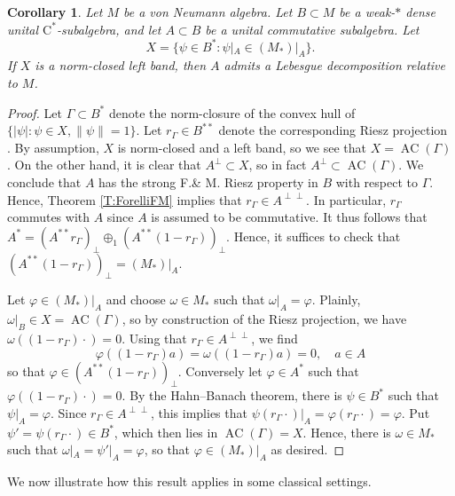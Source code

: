 \documentclass[10pt]{amsart}
\newcommand{\rC}{\mathrm{C}}
\renewcommand{\phi}{\varphi}
\newcommand{\AC}{\operatorname{AC}}
\newtheorem{corollary}[lemma]{Corollary}
\theoremstyle{definition}
\begin{document}
\begin{corollary}\label{C:Lebdecomp}
Let $M$ be a von Neumann algebra. Let $B\subset M$ be a weak-$*$ dense unital $\rC^*$-subalgebra, and let $A\subset B$ be a unital commutative subalgebra. Let
\[
X=\{\psi\in B^*:\psi|_A\in (M_*)|_A\}.
\]
If  $X$ is a
norm-closed left band, then $A$ admits a Lebesgue decomposition relative to $M$.
\end{corollary}
\begin{proof}
Let $\Gamma\subset B^*$ denote the norm-closure of the convex hull of $\{|\psi|:\psi\in X, \|\psi\|=1\}$.  Let $r_\Gamma\in B^{**}$ denote the corresponding Riesz projection \cite[Theorem 3.5]{CT2023Henkin}. By assumption, $X$ is norm-closed and a left band, so we see that $X=\AC(\Gamma)$. On the other hand, it is clear that $A^\perp\subset X$, so in fact $A^\perp \subset \AC(\Gamma)$. We conclude that $A$ has the strong F.\& M. Riesz property in $B$ with respect to $\Gamma$. Hence, Theorem \ref{T:ForelliFM} implies that  $r_\Gamma\in A^{\perp\perp}$. In particular, $r_\Gamma$ commutes with $A$ since $A$ is assumed to be commutative. It thus follows that $A^*=(A^{**} r_\Gamma)_\perp \oplus_1 (A^{**}(1-r_\Gamma))_\perp$. Hence, it suffices to check that $(A^{**}(1-r_\Gamma))_\perp=(M_*)|_A$.

Let $\phi\in (M_*)|_A$ and choose $\omega\in M_*$ such that $\omega|_A=\phi$. Plainly, 
$\omega|
_{B} \in X= \AC(\Gamma)$, so by construction of the Riesz projection, we have $\omega((1-r_\Gamma)\cdot)=0$. Using that $r_\Gamma\in A^{\perp\perp}$, we find
\[
\phi((1-r_\Gamma)a)=\omega((1-r_\Gamma)a)=0, \quad a\in A
\]
so that $\phi\in (A^{**}(1-r_\Gamma))_\perp$. Conversely let $\phi\in A^*$ such that $\phi((1-r_\Gamma)\cdot)=0$. By the Hahn--Banach theorem, there is  $\psi\in B^*$  such that $\psi|_A=\phi$. Since $r_\Gamma\in A^{\perp\perp}$, this implies that $\psi( r_\Gamma \cdot)|_A=\phi(r_\Gamma \cdot)=\phi$. Put $\psi'=\psi(r_\Gamma\cdot )\in B^*$, which then lies  in $\AC(\Gamma)=X$. Hence, there is $\omega\in M_*$ such that $\omega|_A=\psi'|_A=\phi$, so that $\phi\in (M_*)|_A$ as desired.
\end{proof}


We now illustrate how this result applies in some classical settings. 
\end{document}
